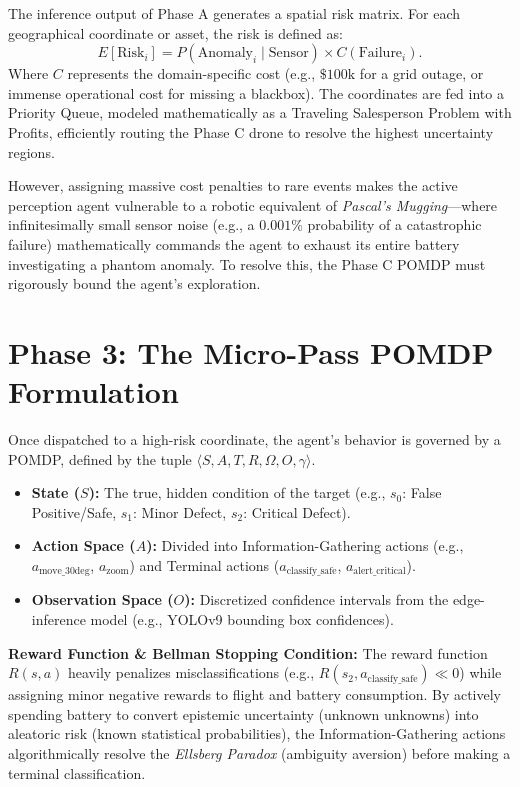 \documentclass[conference]{IEEEtran}
\begin{document}
The inference output of Phase A generates a spatial risk matrix. For each geographical coordinate or asset, the risk is defined as:
\begin{equation}
    E[\text{Risk}_{i}] = P(\text{Anomaly}_{i} \mid \text{Sensor}) \times C(\text{Failure}_{i}).
\end{equation}
Where $C$ represents the domain-specific cost (e.g., $\$100\text{k}$ for a grid outage, or immense operational cost for missing a blackbox). The coordinates are fed into a Priority Queue, modeled mathematically as a Traveling Salesperson Problem with Profits, efficiently routing the Phase C drone to resolve the highest uncertainty regions.

However, assigning massive cost penalties to rare events makes the active perception agent vulnerable to a robotic equivalent of \textit{Pascal's Mugging}---where infinitesimally small sensor noise (e.g., a $0.001\%$ probability of a catastrophic failure) mathematically commands the agent to exhaust its entire battery investigating a phantom anomaly. To resolve this, the Phase C POMDP must rigorously bound the agent's exploration.

\section{Phase 3: The Micro-Pass POMDP Formulation}
Once dispatched to a high-risk coordinate, the agent's behavior is governed by a POMDP, defined by the tuple $\langle S, A, T, R, \Omega, O, \gamma \rangle$.

\begin{itemize}
    \item \textbf{State ($S$):} The true, hidden condition of the target (e.g., $s_0$: False Positive/Safe, $s_1$: Minor Defect, $s_2$: Critical Defect).
    \item \textbf{Action Space ($A$):} Divided into Information-Gathering actions (e.g., $a_{\text{move\_30deg}}$, $a_{\text{zoom}}$) and Terminal actions ($a_{\text{classify\_safe}}$, $a_{\text{alert\_critical}}$).
    \item \textbf{Observation Space ($O$):} Discretized confidence intervals from the edge-inference model (e.g., YOLOv9 bounding box confidences).
\end{itemize}

\textbf{Reward Function \& Bellman Stopping Condition:}
The reward function $R(s, a)$ heavily penalizes misclassifications (e.g., $R(s_2, a_{\text{classify\_safe}}) \ll 0$) while assigning minor negative rewards to flight and battery consumption. By actively spending battery to convert epistemic uncertainty (unknown unknowns) into aleatoric risk (known statistical probabilities), the Information-Gathering actions algorithmically resolve the \textit{Ellsberg Paradox} (ambiguity aversion) before making a terminal classification.
\end{document}
